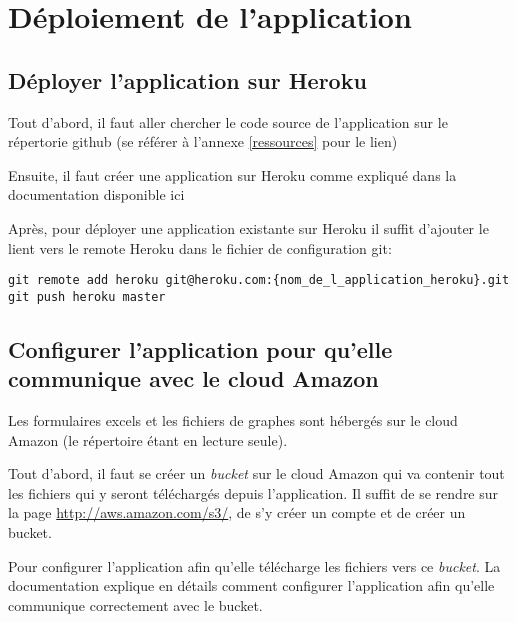 \chapter{Déploiement de l'application}
\section{Déployer l'application sur Heroku}
Tout d'abord, il faut aller chercher le code source de l'application sur le répertorie github (se référer à l'annexe \ref{ressources} pour le lien)

Ensuite, il faut créer une application sur Heroku comme expliqué dans la documentation disponible ici \cite{Heroku}

Après, pour déployer une application existante sur Heroku il suffit d'ajouter le lient vers le remote Heroku dans le fichier de configuration git:

\begin{lstlisting}
git remote add heroku git@heroku.com:{nom_de_l_application_heroku}.git
git push heroku master
\end{lstlisting}

\section{Configurer l'application pour qu'elle communique avec le cloud Amazon}
Les formulaires excels et les fichiers de graphes sont hébergés sur le cloud Amazon (le répertoire étant en lecture seule). 

Tout d'abord, il faut se créer un \textit{bucket} sur le cloud Amazon qui va contenir tout les fichiers qui y seront téléchargés depuis l'application. Il suffit de se rendre sur la page \url{http://aws.amazon.com/s3/}, de s'y créer un compte et de créer un bucket.

Pour configurer l'application afin qu'elle télécharge les fichiers vers ce \textit{bucket}. La documentation \cite{AmazonS3} explique en détails comment configurer l'application afin qu'elle communique correctement avec le bucket. 